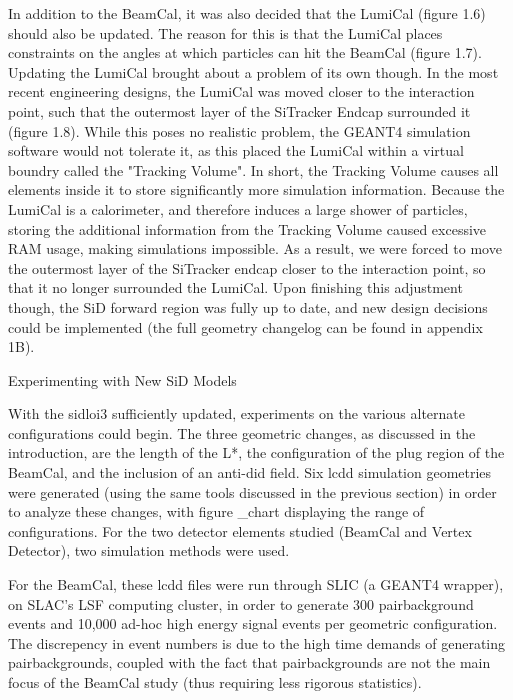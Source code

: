         In addition to the BeamCal, it was also decided that the LumiCal (figure 1.6) should also be updated. The reason for this is that the LumiCal places constraints on the angles at which particles can hit the BeamCal (figure 1.7). Updating the LumiCal brought about a problem of its own though. In the most recent engineering designs, the LumiCal was moved closer to the interaction point, such that the outermost layer of the SiTracker Endcap surrounded it (figure 1.8). While this poses no realistic problem, the GEANT4 simulation software would not tolerate it, as this placed the LumiCal within a virtual boundry called the "Tracking Volume". In short, the Tracking Volume causes all elements inside it to store significantly more simulation information. Because the LumiCal is a calorimeter, and therefore induces a large shower of particles, storing the additional information from the Tracking Volume caused excessive RAM usage, making simulations impossible. As a result, we were forced to move the outermost layer of the SiTracker endcap closer to the interaction point, so that it no longer surrounded the LumiCal. Upon finishing this adjustment though, the SiD forward region was fully up to date, and new design decisions could be implemented (the full geometry changelog can be found in appendix 1B).


    Experimenting with New SiD Models

        With the sidloi3 sufficiently updated, experiments on the various alternate configurations could begin. The three geometric changes, as discussed in the introduction, are the length of the L*, the configuration of the plug region of the BeamCal, and the inclusion of an anti-did field. Six lcdd simulation geometries were generated (using the same tools discussed in the previous section) in order to analyze these changes, with figure \geom_chart displaying the range of configurations. For the two detector elements studied (BeamCal and Vertex Detector), two simulation methods were used. 
        
        For the BeamCal, these lcdd files were run through SLIC (a GEANT4 wrapper), on SLAC's LSF computing cluster, in order to generate 300 pairbackground events and 10,000 ad-hoc high energy signal events per geometric configuration. The discrepency in event numbers is due to the high time demands of generating pairbackgrounds, coupled with the fact that pairbackgrounds are not the main focus of the BeamCal study (thus requiring less rigorous statistics).

